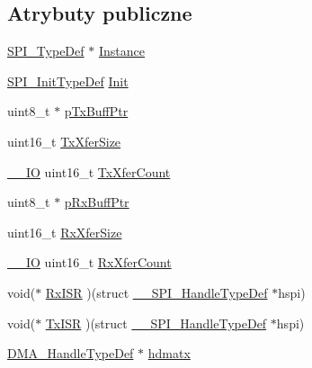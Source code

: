 \subsection*{Atrybuty publiczne}
\begin{DoxyCompactItemize}
\item 
\hyperlink{struct_s_p_i___type_def}{S\+P\+I\+\_\+\+Type\+Def} $\ast$ \hyperlink{struct_____s_p_i___handle_type_def_a97e276bfd322a6028cbac7408cf8e610}{Instance}
\item 
\hyperlink{struct_s_p_i___init_type_def}{S\+P\+I\+\_\+\+Init\+Type\+Def} \hyperlink{struct_____s_p_i___handle_type_def_a4b43d4d72f571b7d2162a2d171bb1312}{Init}
\item 
uint8\+\_\+t $\ast$ \hyperlink{struct_____s_p_i___handle_type_def_adb2e52ab20ae5ae6b89532155fec99af}{p\+Tx\+Buff\+Ptr}
\item 
uint16\+\_\+t \hyperlink{struct_____s_p_i___handle_type_def_a5617a3a7983aedb0d214f318062ebc48}{Tx\+Xfer\+Size}
\item 
\hyperlink{core__sc300_8h_aec43007d9998a0a0e01faede4133d6be}{\+\_\+\+\_\+\+IO} uint16\+\_\+t \hyperlink{struct_____s_p_i___handle_type_def_a186b770dda2e53c4e9a204cd50e17e74}{Tx\+Xfer\+Count}
\item 
uint8\+\_\+t $\ast$ \hyperlink{struct_____s_p_i___handle_type_def_aa770b67ee3966c0aa7409f64b3b99bd8}{p\+Rx\+Buff\+Ptr}
\item 
uint16\+\_\+t \hyperlink{struct_____s_p_i___handle_type_def_ab274a4c2de5e95145d45fe80a289f535}{Rx\+Xfer\+Size}
\item 
\hyperlink{core__sc300_8h_aec43007d9998a0a0e01faede4133d6be}{\+\_\+\+\_\+\+IO} uint16\+\_\+t \hyperlink{struct_____s_p_i___handle_type_def_a67e721440b3449d544a27cfd7726c920}{Rx\+Xfer\+Count}
\item 
void($\ast$ \hyperlink{struct_____s_p_i___handle_type_def_a599045b20d284f94e5a367a85cad9f39}{Rx\+I\+SR} )(struct \hyperlink{struct_____s_p_i___handle_type_def}{\+\_\+\+\_\+\+S\+P\+I\+\_\+\+Handle\+Type\+Def} $\ast$hspi)
\item 
void($\ast$ \hyperlink{struct_____s_p_i___handle_type_def_a4446bdc11698f861edf37b72cf437aeb}{Tx\+I\+SR} )(struct \hyperlink{struct_____s_p_i___handle_type_def}{\+\_\+\+\_\+\+S\+P\+I\+\_\+\+Handle\+Type\+Def} $\ast$hspi)
\item 
\hyperlink{group___d_m_a___exported___types_ga41b754a906b86bce54dc79938970138b}{D\+M\+A\+\_\+\+Handle\+Type\+Def} $\ast$ \hyperlink{struct_____s_p_i___handle_type_def_aa311e9419f520aee2d2fa30668ce485c}{hdmatx}
\item 

\end{DoxyCompactItemize}
